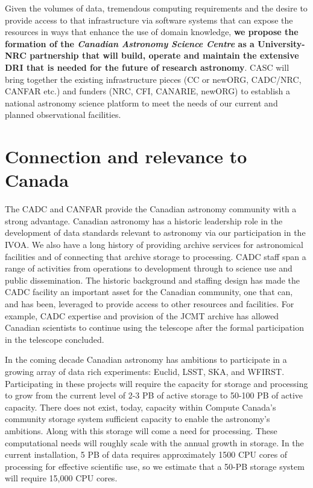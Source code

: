 \documentclass[11pt]{article}
\begin{document}
Given the volumes of data, tremendous computing requirements and the desire to provide access to that infrastructure via software systems that can expose the resources in ways that enhance the use of domain knowledge, {\bf we propose the formation of the {\em Canadian Astronomy Science Centre} as a University-NRC partnership that will build, operate and maintain the extensive DRI that is needed for the future of research astronomy}.  CASC will bring together the existing infrastructure pieces (CC or newORG, CADC/NRC, CANFAR etc.) and funders (NRC, CFI, CANARIE, newORG) to establish a national astronomy science platform to meet the needs of our current and planned observational facilities. 

\section{Connection and relevance to Canada}
The CADC and CANFAR  provide the Canadian astronomy community with a strong advantage.
Canadian astronomy has a historic leadership role in the development of data standards relevant to astronomy via our participation in the IVOA.  
We also have a long history of providing archive services for astronomical facilities and of connecting that archive storage to processing.  CADC staff span a range of activities from operations to development through to science use and public dissemination.  
The historic background and staffing design has made the CADC facility an important asset for the Canadian community, one that can, and has been, leveraged to provide access to other resources and facilities. 
For example, CADC expertise and provision of the JCMT archive has allowed Canadian scientists to continue using the telescope after the formal participation in the telescope concluded.

In the coming decade Canadian astronomy has ambitions to participate in a growing array of data rich experiments:  Euclid, LSST, SKA, and WFIRST.  Participating in these projects will require the capacity for storage and processing to grow from the current level of 2-3 PB of active storage to 50-100 PB of active capacity.  There does not exist, today, capacity within Compute Canada's community storage system sufficient capacity to enable the astronomy's ambitions. Along with this storage will come a need for processing.  These computational needs will roughly scale with the annual growth in storage.   In the current installation, 5 PB of data  requires approximately 1500 CPU cores of processing for effective scientific use, so we estimate that a 50-PB storage system will require 15,000 CPU cores.  
\end{document}
